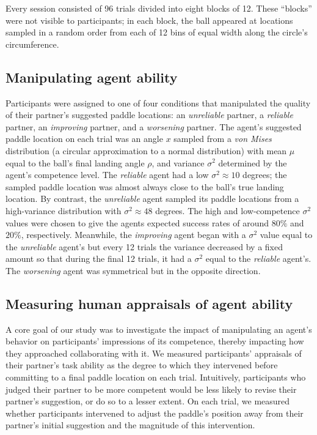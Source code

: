 \documentclass[10pt,letterpaper]{article}
\begin{document}
Every session consisted of 96 trials divided into eight blocks of 12. These ``blocks'' were not visible to participants; in each block, the ball appeared at locations sampled in a random order from each of 12 bins of equal width along the circle's circumference.


\subsection{Manipulating agent ability}

Participants were assigned to one of four conditions that manipulated the quality of their partner's suggested paddle locations: an \textit{unreliable} partner, a \textit{reliable} partner, an \textit{improving} partner, and a \textit{worsening} partner. The agent's suggested paddle location on each trial was an angle $x$ sampled from a \textit{von Mises} distribution (a circular approximation to a normal distribution) with mean $\mu$ equal to the ball's final landing angle $\rho$, and variance $\sigma^2$ determined by the agent's competence level. The \textit{reliable} agent had a low $\sigma^2 \approx 10$ degrees; the sampled paddle location was almost always close to the ball's true landing location. By contrast, the \textit{unreliable} agent sampled its paddle locations from a high-variance distribution with $\sigma^2 \approx 48$ degrees. The high and low-competence $\sigma^2$ values were chosen to give the agents expected success rates of around $80\%$ and $20\%$, respectively. Meanwhile, the \textit{improving} agent began with a $\sigma^2$ value equal to the \textit{unreliable} agent's but every 12 trials the variance decreased by a fixed amount so that during the final 12 trials, it had a $\sigma^2$ equal to the \textit{reliable} agent's. The \textit{worsening} agent was symmetrical but in the opposite direction.


\subsection{Measuring human appraisals of agent ability}

A core goal of our study was to investigate the impact of manipulating an agent's behavior on participants' impressions of its competence, thereby impacting how they approached collaborating with it.
We measured participants' appraisals of their partner's task ability as the degree to which they intervened before committing to a final paddle location on each trial. Intuitively, participants who judged their partner to be more competent would be less likely to revise their partner's suggestion, or do so to a lesser extent. On each trial, we measured whether participants intervened to adjust the paddle's position away from their partner's initial suggestion and the magnitude of this intervention.
\end{document}
